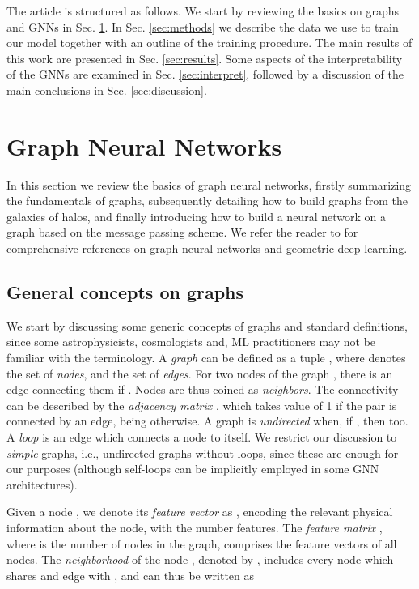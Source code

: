\documentclass[twocolumn]{aastex631}
\begin{document}
The article is structured as follows. We start by reviewing the basics on graphs and GNNs in Sec. \ref{sec:gnn}. In Sec. \ref{sec:methods} we describe the data we use to train our model together with an outline of the training procedure. The main results of this work are presented in Sec. \ref{sec:results}. Some aspects of the interpretability of the GNNs are examined in Sec. \ref{sec:interpret}, followed by a discussion of the main conclusions in Sec. \ref{sec:discussion}.


\section{Graph Neural Networks}
\label{sec:gnn}


In this section we review the basics of graph neural networks, firstly summarizing the fundamentals of graphs, subsequently detailing how to build graphs from the galaxies of halos, and finally introducing how to build a neural network on a graph based on the message passing scheme. We refer the reader to \cite{2021arXiv210413478B, 2018arXiv180601261B, HamiltonBook} for comprehensive references on graph neural networks and geometric deep learning.

\subsection{General concepts on graphs}

We start by discussing some generic concepts of graphs and standard definitions, since some astrophysicists, cosmologists and, ML practitioners may not be familiar with the terminology. A \textit{graph} can be defined as a tuple , where  denotes the set of \textit{nodes}, and  the set of \textit{edges}. For two nodes of the graph , there is an edge connecting them if . Nodes  are thus coined as \textit{neighbors}. The connectivity can be described by the \textit{adjacency matrix} , which takes value of 1 if the pair  is connected by an edge, being  otherwise. A graph is \textit{undirected} when, if , then  too. A \textit{loop} is an edge which connects a node to itself. We restrict our discussion to \textit{simple} graphs, i.e., undirected graphs without loops, since these are enough for our purposes (although self-loops can be implicitly employed in some GNN architectures). 


Given a node , we denote its \textit{feature vector} as , encoding the relevant physical information about the node, with  the number features. The \textit{feature matrix} , where  is the number of nodes in the graph, comprises the feature vectors of all nodes. The \textit{neighborhood} of the node , denoted by , includes every node which shares and edge with , and can thus be written as
\end{document}

